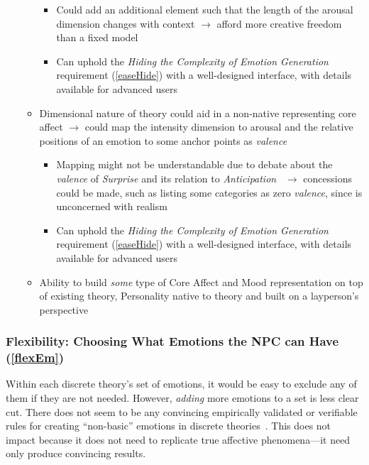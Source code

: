 \begin{itemize}
\begin{itemize}
\begin{itemize}
            \item Could add an additional element such that the length of the
            arousal dimension changes with context $\rightarrow$ afford
            more creative freedom than a fixed model

            \item Can uphold the \textit{Hiding the Complexity of Emotion
                Generation} requirement (\ref{easeHide}) with a well-designed
            interface, with details available for advanced users
        \end{itemize}

        \item Dimensional nature of theory could aid in a non-native
        representing core affect $\rightarrow$ could map the intensity
        dimension to arousal and the relative positions of an emotion to
        some anchor points as \textit{valence}
        \begin{itemize}
            \item Mapping might not be understandable due to debate about the
            \textit{valence} of \textit{Surprise} and its relation to
            \textit{Anticipation}~\citep[p.~98]{susanto2020hourglass}
            $\rightarrow$ concessions could be made, such as listing some
            categories as zero \textit{valence}, since \progname{} is
            unconcerned with realism

            \item Can uphold the \textit{Hiding the Complexity of Emotion
                Generation} requirement (\ref{easeHide}) with a well-designed
            interface, with details available for advanced users
        \end{itemize}

        \item Ability to build \textit{some} type of Core Affect and Mood
        representation on top of existing theory, Personality native to theory
        and built on a layperson's perspective
    \end{itemize}
\end{itemize}

\subsubsection{Flexibility: Choosing What Emotions the NPC can Have
(\ref{flexEm})}
Within each discrete theory's set of emotions, it would be easy to exclude any
of them if they are not needed. However, \textit{adding} more emotions to a set
is less clear cut. There does not seem to be any convincing empirically
validated or verifiable rules for creating ``non-basic'' emotions in discrete
theories~\citep[p.~6]{ortony2021all}. This does not impact \progname{} because
it does not need to replicate true affective phenomena---it need only produce
convincing results.

